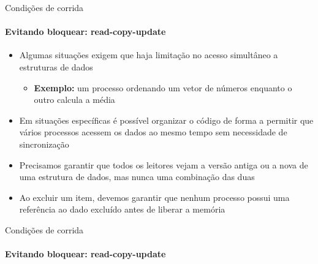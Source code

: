 \documentclass{beamer}
\begin{document}
\begin{frame}{Condições de corrida}
	\framesubtitle{Evitando bloquear: read-copy-update}
	\begin{itemize}
		\item Algumas situações exigem que haja limitação no acesso simultâneo a estruturas de dados
		\begin{itemize}
			\item \textbf{Exemplo:} um processo ordenando um vetor de números enquanto o outro calcula a média
		\end{itemize}
		\item Em situações específicas é possível organizar o código de forma a permitir que vários processos acessem os dados ao mesmo tempo sem necessidade de sincronização
		\item Precisamos garantir que todos os leitores vejam a versão antiga ou a nova de uma estrutura de dados, mas nunca uma combinação das duas
		\item Ao excluir um item, devemos garantir que nenhum processo possui uma referência ao dado excluído antes de liberar a memória
	\end{itemize}
\end{frame}
\begin{frame}{Condições de corrida}
	\framesubtitle{Evitando bloquear: read-copy-update}
	\begin{figure}
	\end{figure}
\end{frame}
\end{document}
